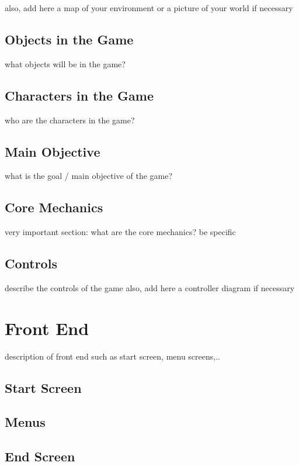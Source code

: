\documentclass[a4paper]{scrreprt}
\begin{document}
also, add here a map of your environment or a picture of your world if necessary

\section{Objects in the Game}
what objects will be in the game?

\section{Characters in the Game}
who are the characters in the game?

\section{Main Objective}
what is the goal / main objective of the game?

\section{Core Mechanics}
very important section: what are the core mechanics? be specific

\section{Controls}
describe the controls of the game
also, add here a controller diagram if necessary



\chapter{Front End}
description of front end such as start screen, menu screens,..

\section{Start Screen}

\section{Menus}

\section{End Screen}

\end{document}
